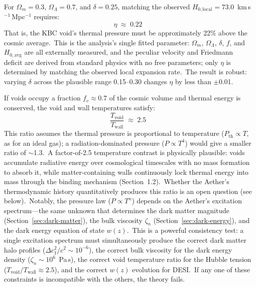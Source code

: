 ﻿\documentclass[12pt,letterpaper]{article}
\begin{document}
For $\Omega_m = 0.3$, $\Omega_\Lambda = 0.7$, and $\delta = 0.25$, matching the
observed $H_{0,\mathrm{local}} = 73.0$~km\,s$^{-1}$\,Mpc$^{-1}$ requires:
%
\begin{equation}
  \eta \;\approx\; 0.22
  \label{eq:eta-required}
\end{equation}
%
That is, the KBC void's thermal pressure must be approximately 22\% above the
cosmic average.\ This is the analysis's single fitted parameter: $\Omega_m$,
$\Omega_\Lambda$, $\delta$, $f$, and $H_{0,\mathrm{avg}}$ are all externally
measured, and the peculiar velocity and Friedmann deficit are derived from
standard physics with no free parameters; only $\eta$ is determined by
matching the observed local expansion rate.\ The result is robust: varying
$\delta$ across the plausible range 0.15--0.30 changes $\eta$ by less than
$\pm$0.01.

If voids occupy a fraction $f_v \approx 0.7$ of the cosmic volume and thermal
energy is conserved, the void and wall temperatures satisfy:
%
\begin{equation}
  \frac{T_{\mathrm{void}}}{T_{\mathrm{wall}}} \;\approx\; 2.5
  \label{eq:T-ratio}
\end{equation}
%
This ratio assumes the thermal pressure is proportional to temperature
($P_{\mathrm{th}} \propto T$, as for an ideal gas); a radiation-dominated
pressure ($P \propto T^4$) would give a smaller ratio of $\sim$1.3.\ A
factor-of-2.5 temperature contrast is physically plausible: voids accumulate
radiative energy over cosmological timescales with no mass formation to absorb
it, while matter-containing walls continuously lock thermal energy into mass
through the binding mechanism (Section~1.2).\ Whether the Aether's thermodynamic
history quantitatively produces this ratio is an open question (see below).\
Notably, the pressure law ($P \propto T^n$) depends on the Aether's excitation
spectrum---the same unknown that determines the dark matter magnitude
(Section~\ref{sec:dark-matter}), the bulk viscosity $\zeta_n$
(Section~\ref{sec:dark-energy}), and the dark energy equation of state
$w(z)$.\ This is a powerful consistency test: a single excitation spectrum
must simultaneously produce the correct dark matter halo profiles
($\Delta c_1^2/c^2 \sim 10^{-6}$), the correct bulk viscosity for the dark
energy density ($\zeta_n \sim 10^6$~Pa\,s), the correct void temperature
ratio for the Hubble tension ($T_{\mathrm{void}}/T_{\mathrm{wall}} \approx
2.5$), and the correct $w(z)$ evolution for DESI.\ If any one of these
constraints is incompatible with the others, the theory fails.
\end{document}

